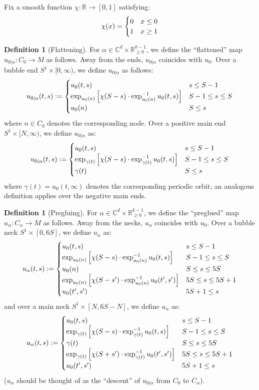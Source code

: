 \documentclass[12pt]{article}
\theoremstyle{definition}
\newtheorem{definition}[theorem]{Definition}
\theoremstyle{remark}
\numberwithin{equation}{subsection}
\newcommand{\CC}{\mathbb C}
\newcommand{\RR}{\mathbb R}
\begin{document}
Fix a smooth function $\chi:\RR\to[0,1]$ satisfying:
\begin{equation}
\chi(x)=\begin{cases}0&x\leq 0\cr 1&x\geq 1\end{cases}
\end{equation}

\begin{definition}[Flattening]
For $\alpha\in\CC^d\times\RR_{\geq 0}^{k-1}$, we define the ``flattened'' map $u_{0|\alpha}:C_0\to M$ as follows.  Away from the ends, $u_{0|\alpha}$ coincides with $u_0$.  Over a bubble end $S^1\times[0,\infty)$, we define $u_{0|\alpha}$ as follows:
\begin{equation}
u_{0|\alpha}(t,s):=\begin{cases}
u_0(t,s)&s\leq S-1\cr
\exp_{u_0(n)}\left[\chi(S-s)\cdot\exp_{u_0(n)}^{-1}u_0(t,s)\right]&S-1\leq s\leq S\cr
u_0(n)&S\leq s
\end{cases}
\end{equation}
where $n\in C_0$ denotes the corresponding node.  Over a positive main end $S^1\times[N,\infty)$, we define $u_{0|\alpha}$ as:
\begin{equation}
u_{0|\alpha}(t,s):=\begin{cases}
u_0(t,s)&s\leq S-1\cr
\exp_{\gamma(t)}\left[\chi(S-s)\cdot\exp_{\gamma(t)}^{-1}u_0(t,s)\right]&S-1\leq s\leq S\cr
\gamma(t)&S\leq s
\end{cases}
\end{equation}
where $\gamma(t)=u_0(t,\infty)$ denotes the corresponding periodic orbit; an analogous definition applies over the negative main ends.
\end{definition}

\begin{definition}[Pregluing]
For $\alpha\in\CC^d\times\RR_{\geq 0}^{k-1}$, we define the ``preglued'' map $u_\alpha:C_\alpha\to M$ as follows.  Away from the necks, $u_\alpha$ coincides with $u_0$.  Over a bubble neck $S^1\times[0,6S]$, we define $u_\alpha$ as:
\begin{equation}
u_\alpha(t,s):=\begin{cases}
u_0(t,s)&s\leq S-1\cr
\exp_{u_0(n)}\left[\chi(S-s)\cdot\exp_{u_0(n)}^{-1}u_0(t,s)\right]&S-1\leq s\leq S\cr
u_0(n)&S\leq s\leq 5S\cr
\exp_{u_0(n)}\left[\chi(S-s')\cdot\exp_{u_0(n)}^{-1}u_0(t',s')\right]&5S\leq s\leq 5S+1\cr
u_0(t',s')&5S+1\leq s
\end{cases}
\end{equation}
and over a main neck $S^1\times[N,6S-N]$, we define $u_\alpha$ as:
\begin{equation}
u_\alpha(t,s):=\begin{cases}
u_0(t,s)&s\leq S-1\cr
\exp_{\gamma(t)}\left[\chi(S-s)\cdot\exp_{\gamma(t)}^{-1}u_0(t,s)\right]&S-1\leq s\leq S\cr
\gamma(t)&S\leq s\leq 5S\cr
\exp_{\gamma(t)}\left[\chi(S+s')\cdot\exp_{\gamma(t)}^{-1}u_0(t',s')\right]&5S\leq s\leq 5S+1\cr
u_0(t',s')&5S+1\leq s
\end{cases}
\end{equation}
($u_\alpha$ should be thought of as the ``descent'' of $u_{0|\alpha}$ from $C_0$ to $C_\alpha$).
\end{definition}
\end{document}

